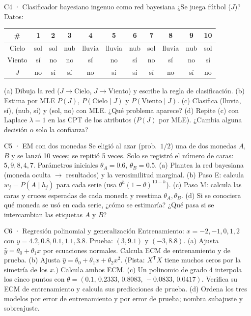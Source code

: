 \begin{ejercicio}{C4 · Clasificador bayesiano ingenuo como red bayesiana }
¿Se juega fútbol ($J$)? Datos:
\begin{center}\small
\begin{tabular}{c|cccccccccc}
\# & 1&2&3&4&5&6&7&8&9&10\\\hline
Cielo & sol&sol&nub&lluvia&lluvia&nub&sol&lluvia&nub&sol\\
Viento & sí&no&no&sí&no&sí&no&sí&no&sí\\
$J$ & no&sí&sí&no&sí&sí&sí&no&sí&no
\end{tabular}
\end{center}
(a)  Dibuja la red ($J\to\text{Cielo}$, $J\to\text{Viento}$) y escribe la regla de clasificación.
(b)  Estima por MLE $P(J)$, $P(\text{Cielo}\mid J)$ y $P(\text{Viento}\mid J)$.
(c)  Clasifica (lluvia, sí), (nub, sí) y (sol, no) con MLE. ¿Qué problema aparece?
(d)  Repite (c) con Laplace $\lambda=1$ en las CPT de los atributos ($P(J)$ por MLE). ¿Cambia alguna decisión o solo la confianza?
\end{ejercicio}

\begin{ejercicio}{C5 · EM con dos monedas }
Se eligió al azar (prob.\ $1/2$) una de dos monedas $A$, $B$ y se lanzó 10 veces; se repitió 5 veces. Solo se registró el número
de caras: $5,9,8,4,7$. Parámetros iniciales $\theta_A=0.6$, $\theta_B=0.5$.
(a)  Plantea la red bayesiana (moneda oculta $\to$ resultados) y la verosimilitud marginal.
(b)  Paso E: calcula $w_j=P(A\mid h_j)$ para cada serie (usa $\theta^h(1-\theta)^{10-h}$).
(c)  Paso M: calcula las caras y cruces esperadas de cada moneda y reestima $\theta_A,\theta_B$.
(d)  Si se conociera qué moneda se usó en cada serie, ¿cómo se estimaría? ¿Qué pasa si se intercambian las etiquetas $A$ y $B$?
\end{ejercicio}

\begin{ejercicio}{C6 · Regresión polinomial y generalización }
Entrenamiento: $x=-2,-1,0,1,2$ con $y=4.2,0.8,0.1,1.1,3.8$. Prueba: $(3,9.1)$ y $(-3,8.8)$.
(a)  Ajusta $\hat y=\theta_0+\theta_1x$ por ecuaciones normales. Calcula ECM de entrenamiento y de prueba.
(b)  Ajusta $\hat y=\theta_0+\theta_1x+\theta_2x^2$. (Pista: $X^\mathsf TX$ tiene muchos ceros por la simetría de los $x$.) Calcula ambos ECM.
(c)  Un polinomio de grado 4 interpola los cinco puntos con $\theta=(0.1,\,0.2333,\,0.8083,\,-0.0833,\,0.0417)$.
Verifica su ECM de entrenamiento y calcula sus predicciones de prueba.
(d)  Ordena los tres modelos por error de entrenamiento y por error de prueba; nombra subajuste y sobreajuste.
\end{ejercicio}


